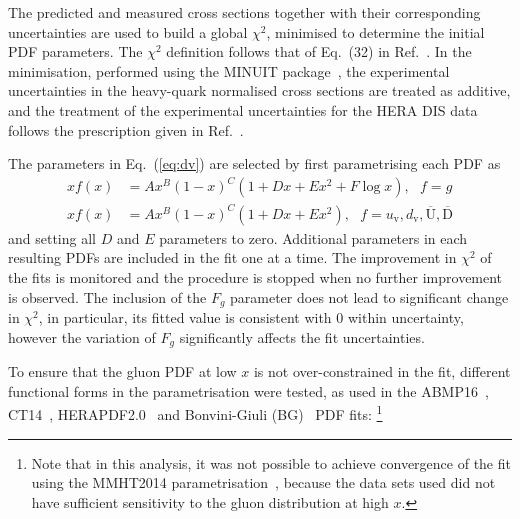 \documentclass[12pt]{article}
\begin{document}
The predicted and measured cross sections together with their corresponding uncertainties are used to build a global $\chi^2$, minimised to determine the initial PDF
parameters. The $\chi^2$ definition follows that of Eq.~(32) in Ref.~\cite{Abramowicz:2015mha}. In the minimisation, performed 
using the MINUIT package~\cite{James:1975dr}, the experimental uncertainties in the heavy-quark normalised cross 
sections are treated as additive, and the treatment of the experimental uncertainties for the HERA DIS data follows 
the prescription given in Ref.~\cite{Abramowicz:2015mha}.

The parameters in Eq.~(\ref{eq:dv}) are selected by first parametrising each PDF as
\begin{equation}
\begin{split}
xf(x) &= Ax^B(1-x)^C(1+Dx+Ex^2+F {\log x}), ~~~f=g\\
xf(x) &= Ax^B(1-x)^C(1+Dx+Ex^2), 
~~~f=u_\mathrm{v},d_\mathrm{v},\overline{\mathrm{U}},\overline{\mathrm{D}}
\end{split}
\label{eq:de}
\end{equation}
and setting all $D$ and $E$ parameters to zero.
Additional parameters in each resulting PDFs are included in the fit one at a time. 
The improvement in $\chi^2$ of the fits is monitored and the procedure is stopped when no further improvement is observed. The inclusion of the $F_{g}$ parameter does not lead to significant change in $\chi^2$, in particular, its fitted value is consistent with $0$ within uncertainty, however the variation of $F_{g}$ significantly affects the fit uncertainties.

To ensure that the gluon PDF at low $x$ is not over-constrained in the fit, different functional forms in the parametrisation were tested, as used in the ABMP16~\cite{Alekhin:2017kpj}, CT14~\cite{Dulat:2015mca}, HERAPDF2.0~\cite{Abramowicz:2015mha} and Bonvini-Giuli (BG)~\cite{Bonvini:2019wxf} PDF fits:%
\footnote{Note that in this analysis, it was not possible to achieve convergence of the fit using the MMHT2014 parametrisation~\cite{Harland-Lang:2014zoa}, because the data sets used did not have sufficient sensitivity to the gluon distribution at high $x$.}
\end{document}
